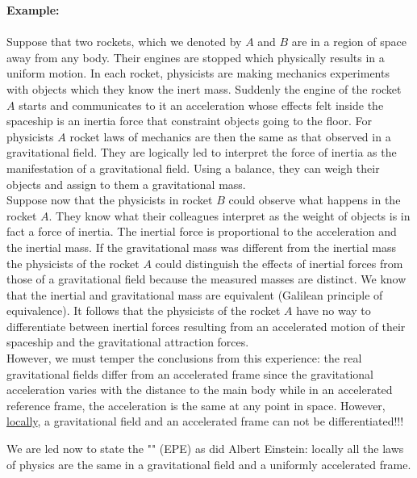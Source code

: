 	\begin{tcolorbox}[colframe=black,colback=white,sharp corners]
\textbf{{\Large {}}Example:}\\\\
		Suppose that two rockets, which we denoted by $A$ and $B$ are in a region of space away from any body. Their engines are stopped which physically results in a uniform motion. In each rocket, physicists are making mechanics experiments with objects which they know the inert mass. Suddenly the engine of the rocket $A$ starts and communicates to it an acceleration whose effects felt inside the spaceship is an inertia force that constraint objects going to the floor. For physicists $A$ rocket laws of mechanics are then the same as that observed in a gravitational field. They are logically led to interpret the force of inertia as the manifestation of a gravitational field. Using a balance, they can weigh their objects and assign to them a gravitational mass.\\
		
		Suppose now that the physicists in rocket $B$ could observe what happens in the rocket $A$. They know what their colleagues interpret as the weight of objects is in fact a force of inertia. The inertial force is proportional to the acceleration and the inertial mass. If the gravitational mass was different from the inertial mass the physicists of the rocket $A$ could distinguish the effects of inertial forces from those of a gravitational field because the measured masses are distinct. We know that the inertial and gravitational mass are equivalent (Galilean principle of equivalence). It follows that the physicists of the rocket $A$ have no way to differentiate between inertial forces resulting from an accelerated motion of their spaceship and the gravitational attraction forces.\\
		
		However, we must temper the conclusions from this experience: the real gravitational fields differ from an accelerated frame since the gravitational acceleration varies with the distance to the main body while in an accelerated reference frame, the acceleration is the same at any point in space. However, \underline{locally}, a gravitational field and an accelerated frame can not be differentiated!!!
	\end{tcolorbox}
	
	We are led now to state the "" (EPE) as did Albert Einstein: locally all the laws of physics are the same in a gravitational field and a uniformly accelerated frame.
	

